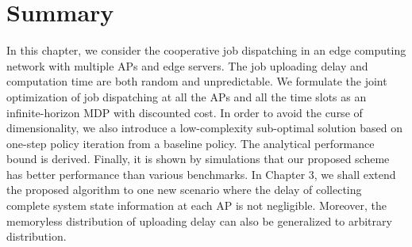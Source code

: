 \section{Summary}
\label{sec:chapter3_prev-conclusion}
In this chapter, we consider the cooperative job dispatching in an edge computing network with multiple APs and edge servers. The job uploading delay and computation time are both random and unpredictable. We formulate the joint optimization of job dispatching at all the APs and all the time slots as an infinite-horizon MDP with discounted cost. In order to avoid the curse of dimensionality, we also introduce a low-complexity sub-optimal solution based on one-step policy iteration from a baseline policy. The analytical performance bound is derived. Finally, it is shown by simulations that our proposed scheme has better performance than various benchmarks.
In Chapter 3, we shall extend the proposed algorithm to one new scenario where the delay of collecting complete system state information at each AP is not negligible.
Moreover, the memoryless distribution of uploading delay can also be generalized to arbitrary distribution.
